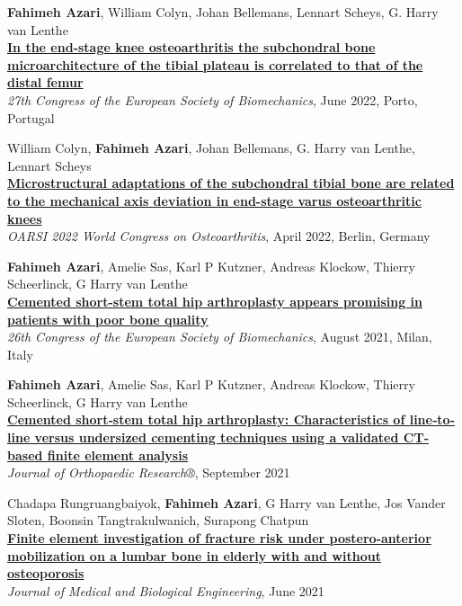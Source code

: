 \documentclass[8pt]{article}
\begin{document}
\begin{bibenum}
	\item{} \textbf{Fahimeh Azari}, William Colyn, Johan Bellemans, Lennart Scheys, G. Harry van Lenthe\\
	\href{https://scholar.google.com/citations?view_op=view_citation&hl=en&user=C-ZuElMAAAAJ&citation_for_view=C-ZuElMAAAAJ:qjMakFHDy7sC}{\textbf{In the end-stage knee osteoarthritis the subchondral bone microarchitecture of the tibial plateau is correlated to that of the distal femur}}\\
	\textit{27th Congress of the European Society of Biomechanics}, June 2022, Porto, Portugal

	\item{} William Colyn, \textbf{Fahimeh Azari}, Johan Bellemans, G. Harry van Lenthe, Lennart Scheys\\
	\href{https://scholar.google.com/citations?view_op=view_citation&hl=en&user=C-ZuElMAAAAJ&citation_for_view=C-ZuElMAAAAJ:qjMakFHDy7sC}{\textbf{Microstructural adaptations of the subchondral tibial bone are related to the mechanical axis deviation in end-stage varus osteoarthritic knees}}\\
	\textit{OARSI 2022 World Congress on Osteoarthritis}, April 2022, Berlin, Germany


	\item{} \textbf{Fahimeh Azari}, Amelie Sas, Karl P Kutzner, Andreas Klockow, Thierry Scheerlinck, G Harry van Lenthe\\
	\href{https://scholar.google.com/citations?view_op=view_citation&hl=en&user=C-ZuElMAAAAJ&citation_for_view=C-ZuElMAAAAJ:9yKSN-GCB0IC7}{\textbf{Cemented short-stem total hip arthroplasty appears promising in patients with poor bone quality}}\\
	\textit{26th Congress of the European Society of Biomechanics}, August 2021, Milan, Italy

	\item{} \textbf{Fahimeh Azari}, Amelie Sas, Karl P Kutzner, Andreas Klockow, Thierry Scheerlinck, G Harry van Lenthe\\
	\href{https://onlinelibrary.wiley.com/doi/full/10.1002/jor.24887}{\textbf{Cemented short‐stem total hip arthroplasty: Characteristics of line‐to‐line versus undersized cementing techniques using a validated CT‐based finite element analysis}}\\
	\textit{Journal of Orthopaedic Research®}, September 2021
	
		\item{} Chadapa Rungruangbaiyok, \textbf{Fahimeh Azari}, G Harry van Lenthe, Jos Vander Sloten, Boonsin Tangtrakulwanich, Surapong Chatpun\\
	\href{https://link.springer.com/article/10.1007/s40846-021-00607-1}{\textbf{Finite element investigation of fracture risk under postero-anterior mobilization on a lumbar bone in elderly with and without osteoporosis}}\\
	\textit{Journal of Medical and Biological Engineering}, June 2021


\end{bibenum}
\end{document}
